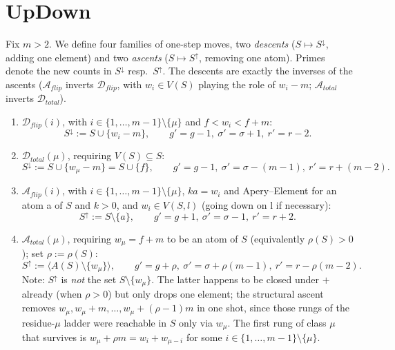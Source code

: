 \documentclass[11pt, a4paper]{article}
\begin{document}
\section{UpDown}

Fix $m > 2$. We define four families of one-step moves, two
\emph{descents} ($S \mapsto S^\downarrow$, adding one element) and
two \emph{ascents} ($S \mapsto S^\uparrow$, removing one atom).
Primes denote the new counts in $S^\downarrow$ resp.\ $S^\uparrow$.
The descents are exactly the inverses of the ascents
($\mathcal{A}_{flip}$ inverts $\mathcal{D}_{flip}$, with
$w_i \in V(S)$ playing the role of $w_i - m$;
$\mathcal{A}_{total}$ inverts $\mathcal{D}_{total}$).

\begin{enumerate}
    \item $\mathcal{D}_{flip}(i)$, with $i \in \{1,\dots,m-1\}\setminus\{\mu\}$
    and $f < w_i < f + m$:
    \[S^\downarrow := S \cup \{w_i - m\}, \qquad
       g' = g - 1,\ \sigma' = \sigma + 1,\ r' = r - 2.\]

    \item $\mathcal{D}_{total}(\mu)$, requiring $V(S) \subseteq S$:
    \[S^\downarrow := S \cup \{w_\mu - m\} = S \cup \{f\}, \qquad
       g' = g - 1,\ \sigma' = \sigma - (m-1),\ r' = r + (m-2).\]

    \item $\mathcal{A}_{flip}(i)$, with $i \in \{1,\dots,m-1\}\setminus\{\mu\}$,
    $ka=w_i$ and Apery--Element for an atom a of $S$ and $k>0$, and $w_i \in V(S,l)$ (going down on l if necessary):
    \[S^\uparrow := S \setminus \{a\}, \qquad
       g' = g + 1,\ \sigma' = \sigma - 1,\ r' = r + 2.\]

    \item $\mathcal{A}_{total}(\mu)$, requiring $w_\mu = f+m$
    to be an atom of $S$ (equivalently $\rho(S) > 0$); set
    $\rho := \rho(S)$:
    \[S^\uparrow := \bigl\langle A(S) \setminus \{w_\mu\} \bigr\rangle, \qquad
       g' = g + \rho,\ \sigma' = \sigma + \rho(m-1),\ r' = r - \rho(m-2).\]
    Note: $S^\uparrow$ is \emph{not} the set $S \setminus \{w_\mu\}$.
    The latter happens to be closed under $+$ already (when $\rho > 0$)
    but only drops one element; the structural ascent removes
    $w_\mu, w_\mu + m, \dots, w_\mu + (\rho-1)m$ in one shot, since
    those rungs of the residue-$\mu$ ladder were reachable in $S$
    only via $w_\mu$. The first rung of class $\mu$ that survives is
    $w_\mu + \rho m = w_i + w_{\mu-i}$ for some
    $i \in \{1,\dots,m-1\}\setminus\{\mu\}$.
\end{enumerate}
\end{document}
